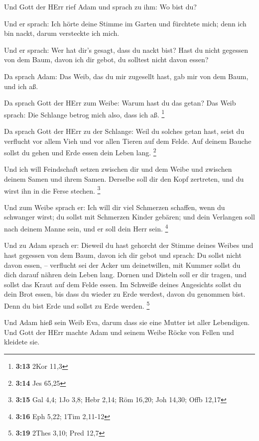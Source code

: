  Und Gott der HErr rief Adam und sprach zu ihm: Wo bist du?

 Und er sprach: Ich hörte deine Stimme im Garten und
fürchtete mich; denn ich bin nackt, darum versteckte ich mich.

 Und er sprach: Wer hat dir's gesagt, dass du nackt bist?
Hast du nicht gegessen von dem Baum, davon ich dir gebot, du solltest
nicht davon essen?

 Da sprach Adam: Das Weib, das du mir zugesellt hast, gab
mir von dem Baum, und ich aß.

 Da sprach Gott der HErr zum Weibe: Warum hast du das
getan? Das Weib sprach: Die Schlange betrog mich also, dass ich aß.
\footnote{\textbf{3:13} 2Kor 11,3}

 Da sprach Gott der HErr zu der Schlange: Weil du solches
getan hast, seist du verflucht vor allem Vieh und vor allen Tieren auf
dem Felde. Auf deinem Bauche sollst du gehen und Erde essen dein Leben
lang. \footnote{\textbf{3:14} Jes 65,25}

 Und ich will Feindschaft setzen zwischen dir und dem Weibe
und zwischen deinem Samen und ihrem Samen. Derselbe soll dir den Kopf
zertreten, und du wirst ihn in die Ferse stechen. \footnote{\textbf{3:15}
  Gal 4,4; 1Jo 3,8; Hebr 2,14; Röm 16,20; Joh 14,30; Offb 12,17}

 Und zum Weibe sprach er: Ich will dir viel Schmerzen
schaffen, wenn du schwanger wirst; du sollst mit Schmerzen Kinder
gebären; und dein Verlangen soll nach deinem Manne sein, und er soll
dein Herr sein. \footnote{\textbf{3:16} Eph 5,22; 1Tim 2,11-12}

 Und zu Adam sprach er: Dieweil du hast gehorcht der Stimme
deines Weibes und hast gegessen von dem Baum, davon ich dir gebot und
sprach: Du sollst nicht davon essen, -- verflucht sei der Acker um
deinetwillen, mit Kummer sollst du dich darauf nähren dein Leben lang.
 Dornen und Disteln soll er dir tragen, und sollst das
Kraut auf dem Felde essen.  Im Schweiße deines Angesichts
sollst du dein Brot essen, bis dass du wieder zu Erde werdest, davon du
genommen bist. Denn du bist Erde und sollst zu Erde werden. \footnote{\textbf{3:19}
  2Thes 3,10; Pred 12,7}

 Und Adam hieß sein Weib Eva, darum dass sie eine Mutter
ist aller Lebendigen.  Und Gott der HErr machte Adam und
seinem Weibe Röcke von Fellen und kleidete sie.


